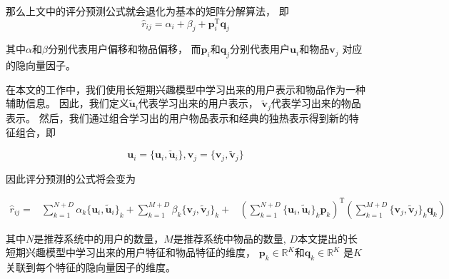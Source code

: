 那么上文中的评分预测公式就会退化为基本的矩阵分解算法，
即
\begin{equation}
\hat{r}_{ij} = \alpha_i + \beta_j + \mathbf{p}_i ^ \mathrm{T} \mathbf{q}_j
\end{equation}

其中$\alpha$和$\beta$分别代表用户偏移和物品偏移，
而$\mathbf{p}_i$和$\mathbf{q}_j$分别代表用户$\mathbf{u}_i$和物品$\mathbf{v}_j$
对应的隐向量因子。


在本文的工作中，我们使用长短期兴趣模型中学习出来的用户表示和物品作为一种辅助信息。
因此，我们定义$\tilde{\mathbf{u}}_i$代表学习出来的用户表示，
$\tilde{\mathbf{v}}_j$代表学习出来的物品表示。
然后，我们通过组合学习出的用户物品表示和经典的独热表示得到新的特征组合，即

\begin{equation}
\mathbf{u}_{i} = \{ \mathbf{u}_{i} , \tilde{\mathbf{u}}_i \} , 
\mathbf{v}_{j} = \{ \mathbf{v}_{j} , \tilde{\mathbf{v}}_j \}
\end{equation}

因此评分预测的公式将会变为

\begin{equation}
\begin{aligned}
\hat{r}_{ij} =
&\sum_{k=1}^{N+D} \alpha_k \{ \mathbf{u}_i , \tilde{\mathbf{u}}_i \}_k +
\sum_{k=1}^{M+D} \beta_k  \{ \mathbf{v}_j , \tilde{\mathbf{v}}_j \}_k + 
&\left( \sum_{k=1}^{N+D} \{ \mathbf{u}_i , \tilde{\mathbf{u}}_i \}_k \mathbf{p}_k \right) ^ \mathrm{T}
\left( \sum_{k=1}^{M+D} \{ \mathbf{v}_j , \tilde{\mathbf{v}}_j \}_k \mathbf{q}_k \right)
\end{aligned}
\end{equation}

其中$N$是推荐系统中的用户的数量，$M$是推荐系统中物品的数量,
$D$本文提出的长短期兴趣模型中学习出来的用户特征和物品特征的维度，
$\mathbf{p}_{k} \in \mathbb{R}^K$和$\mathbf{q}_{k} \in \mathbb{R}^K$
是$K$关联到每个特征的隐向量因子的维度。


